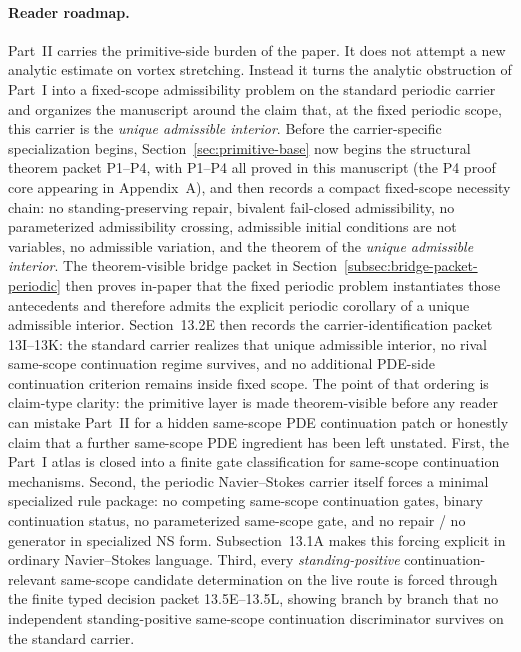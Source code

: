 \paragraph{Reader roadmap.} Part~II carries the primitive-side burden of the paper. It does not attempt a new analytic estimate on vortex stretching. Instead it turns the analytic obstruction of Part~I into a fixed-scope admissibility problem on the standard periodic carrier and organizes the manuscript around the claim that, at the fixed periodic scope, this carrier is the \emph{unique admissible interior}. Before the carrier-specific specialization begins, Section~\ref{sec:primitive-base} now begins the structural theorem packet P1--P4, with P1--P4 all proved in this manuscript (the P4 proof core appearing in Appendix~A), and then records a compact fixed-scope necessity chain: no standing-preserving repair, bivalent fail-closed admissibility, no parameterized admissibility crossing, admissible initial conditions are not variables, no admissible variation, and the theorem of the \emph{unique admissible interior}. The theorem-visible bridge packet in Section~\ref{subsec:bridge-packet-periodic} then proves in-paper that the fixed periodic problem instantiates those antecedents and therefore admits the explicit periodic corollary of a unique admissible interior. Section~13.2E then records the carrier-identification packet 13I--13K: the standard carrier realizes that unique admissible interior, no rival same-scope continuation regime survives, and no additional PDE-side continuation criterion remains inside fixed scope. The point of that ordering is claim-type clarity: the primitive layer is made theorem-visible before any reader can mistake Part~II for a hidden same-scope PDE continuation patch or honestly claim that a further same-scope PDE ingredient has been left unstated.
First, the Part~I atlas is closed into a finite gate classification for same-scope continuation mechanisms.
Second, the periodic Navier--Stokes carrier itself forces a minimal specialized rule package: no competing same-scope continuation gates, binary continuation status, no parameterized same-scope gate, and no repair / no generator in specialized NS form. Subsection~13.1A makes this forcing explicit in ordinary Navier--Stokes language.
Third, every \emph{standing-positive} continuation-relevant same-scope candidate determination on the live route is forced through the finite typed decision packet 13.5E--13.5L, showing branch by branch that no independent standing-positive same-scope continuation discriminator survives on the standard carrier.

